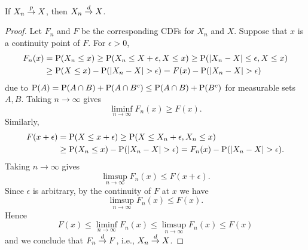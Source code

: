 \begin{proposition}
    If $X_n\pto X$, then $X_n\dto X$. 
\end{proposition}
\begin{proof}
    Let $F_n$ and $F$ be the corresponding CDFs for $X_n$ and $X$. Suppose that 
    $x$ is a continuity point of $F$. For $\epsilon>0$, 
    \begin{equation*}
        \begin{split}
            F_n(x) &= \P(X_n\leq x) \geq \P(X_n \leq X + \epsilon, X \leq x) 
            \geq \P(\abs{X_n - X}\leq \epsilon, X\leq x) \\
            &\geq \P(X\leq x) - \P(\abs{X_n - X}> \epsilon) = F(x) - \P(\abs{X_n - X}>\epsilon)
        \end{split}
    \end{equation*}
    due to $\P(A) = \P(A\cap B) + \P(A\cap B^c) \leq \P(A\cap B) + \P(B^c)$ 
    for measurable sets $A,B$. Taking $n\to\infty$ gives 
    \begin{equation*}
        \liminf_{n\to\infty}F_n(x)\geq F(x). 
    \end{equation*}
    Similarly, 
    \begin{equation*}
        \begin{split}
            F(x+\epsilon) &= \P(X\leq x+\epsilon) \geq \P(X\leq X_n+\epsilon, X_n\leq x) \\
            &\geq \P(X_n\leq x) - \P(\abs{X_n - X}>\epsilon) 
            = F_n(x) - \P(\abs{X_n - X}>\epsilon). 
        \end{split}
    \end{equation*}
    Taking $n\to\infty$ gives 
    \begin{equation*}
        \limsup_{n\to\infty} F_n(x) \leq F(x+\epsilon). 
    \end{equation*}
    Since $\epsilon$ is arbitrary, by the continuity of $F$ at $x$ we have 
    \begin{equation*}
        \limsup_{n\to\infty} F_n(x) \leq F(x). 
    \end{equation*}
    Hence 
    \begin{equation*}
        F(x)\leq \liminf_{n\to\infty}F_n(x)\leq \limsup_{n\to\infty} F_n(x) \leq F(x)
    \end{equation*}
    and we conclude that $F_n\dto F$, i.e., $X_n\dto X$. 
\end{proof}

